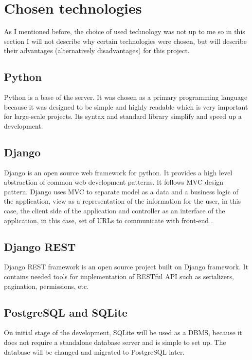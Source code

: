 \section{Chosen technologies}
As I mentioned before, the choice of used technology was not up to me so in this section I will not describe why
certain technologies were chosen, but will describe their advantages (alternatively disadvantages) for this project.


\subsection{Python}
Python is a base of the server. It was chosen as a primary programming language because it was designed to be simple
and highly readable which is very important for large-scale projects. Its syntax and standard library simplify and
speed up a development.

\subsection{Django}
Django is an open source web framework for python. It provides a high level abstraction of common web development
patterns. It follows \ac{MVC} design pattern. Django uses \ac{MVC} to separate model as a data and a business logic of
the application, view as a representation of the information for the user, in this case, the client side of the
application and controller as an interface of the application, in this case, set of URLs to communicate with
front-end \cite{django}.

\subsection{Django REST}
Django REST framework is an open source project built on Django framework. It contains needed tools for implementation
of \ac{REST}ful \ac{API} such as serializers, pagination, permissions, etc.

\subsection{PostgreSQL and SQLite}
On initial stage of the development, SQLite will be used as a \ac{DBMS}, because it does not require a standalone
database server and is simple to set up. The database will be changed and migrated to PostgreSQL later.


